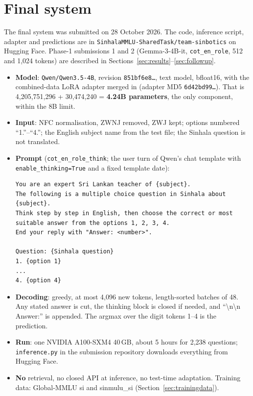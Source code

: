 \documentclass[10pt,a4paper]{article}
\newcommand{\cond}[1]{\texttt{#1}}
\begin{document}
\section{Final system}\label{sec:system}
The final system was submitted on 28 October 2026. The code, inference script, adapter and predictions are in
\texttt{SinhalaMMLU-SharedTask/team-sinbotics} on Hugging Face. Phase-1 submissions 1 and 2 (Gemma-3-4B-it,
\cond{cot\_en\_role}, 512 and 1,024 tokens) are described in Sections~\ref{sec:results}--\ref{sec:followup}.
\begin{itemize}
\item \textbf{Model}: \texttt{Qwen/Qwen3.5-4B}, revision \texttt{851bf6e8\ldots}, text model, bfloat16, with the
combined-data LoRA adapter merged in (adapter MD5 \texttt{6d42bd99\ldots}). That is 4,205,751,296 + 30,474,240 =
\textbf{4.24B parameters}, the only component, within the 8B limit.
\item \textbf{Input}: NFC normalisation, ZWNJ removed, ZWJ kept; options numbered ``1.''--``4.''; the English subject
name from the test file; the Sinhala question is not translated.
\item \textbf{Prompt} (\cond{cot\_en\_role\_think}; the user turn of Qwen's chat template with
\texttt{enable\_thinking=True} and a fixed template date):
\begin{Verbatim}[fontsize=\small,frame=single]
You are an expert Sri Lankan teacher of {subject}.
The following is a multiple choice question in Sinhala about {subject}.
Think step by step in English, then choose the correct or most suitable answer from the options 1, 2, 3, 4.
End your reply with "Answer: <number>".

Question: {Sinhala question}
1. {option 1}
...
4. {option 4}
\end{Verbatim}
\item \textbf{Decoding}: greedy, at most 4,096 new tokens, length-sorted batches of 48. Any stated answer is cut,
the thinking block is closed if needed, and ``\textbackslash n\textbackslash n Answer:\textvisiblespace'' is appended.
The argmax over the digit tokens 1--4 is the prediction.
\item \textbf{Run}: one NVIDIA A100-SXM4 40\,GB, about 5 hours for 2,238 questions; \texttt{inference.py} in the
submission repository downloads everything from Hugging Face.
\item \textbf{No} retrieval, no closed API at inference, no test-time adaptation. Training data: Global-MMLU si and
sinmulu\_si (Section~\ref{sec:trainingdata}).
\end{itemize}
\end{document}
